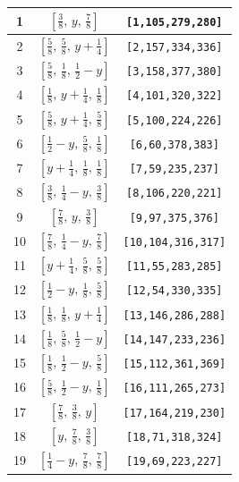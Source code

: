 \documentclass[fleqn,8pt]{jsarticle}
\begin{document}
\begin{longtable}{ccc}
1 & $\left[ \frac{3}{8},\, y,\, \frac{7}{8} \right]$ & {\tt [1,105,279,280]} \\ \hline
2 & $\left[ \frac{5}{8},\, \frac{5}{8},\, y + \frac{1}{4} \right]$ & {\tt [2,157,334,336]} \\ \hline
3 & $\left[ \frac{5}{8},\, \frac{1}{8},\, \frac{1}{2} - y \right]$ & {\tt [3,158,377,380]} \\ \hline
4 & $\left[ \frac{1}{8},\, y + \frac{1}{4},\, \frac{1}{8} \right]$ & {\tt [4,101,320,322]} \\ \hline
5 & $\left[ \frac{5}{8},\, y + \frac{1}{4},\, \frac{5}{8} \right]$ & {\tt [5,100,224,226]} \\ \hline
6 & $\left[ \frac{1}{2} - y,\, \frac{5}{8},\, \frac{1}{8} \right]$ & {\tt [6,60,378,383]} \\ \hline
7 & $\left[ y + \frac{1}{4},\, \frac{1}{8},\, \frac{1}{8} \right]$ & {\tt [7,59,235,237]} \\ \hline
8 & $\left[ \frac{3}{8},\, \frac{1}{4} - y,\, \frac{3}{8} \right]$ & {\tt [8,106,220,221]} \\ \hline
9 & $\left[ \frac{7}{8},\, y,\, \frac{3}{8} \right]$ & {\tt [9,97,375,376]} \\ \hline
10 & $\left[ \frac{7}{8},\, \frac{1}{4} - y,\, \frac{7}{8} \right]$ & {\tt [10,104,316,317]} \\ \hline
11 & $\left[ y + \frac{1}{4},\, \frac{5}{8},\, \frac{5}{8} \right]$ & {\tt [11,55,283,285]} \\ \hline
12 & $\left[ \frac{1}{2} - y,\, \frac{1}{8},\, \frac{5}{8} \right]$ & {\tt [12,54,330,335]} \\ \hline
13 & $\left[ \frac{1}{8},\, \frac{1}{8},\, y + \frac{1}{4} \right]$ & {\tt [13,146,286,288]} \\ \hline
14 & $\left[ \frac{1}{8},\, \frac{5}{8},\, \frac{1}{2} - y \right]$ & {\tt [14,147,233,236]} \\ \hline
15 & $\left[ \frac{1}{8},\, \frac{1}{2} - y,\, \frac{5}{8} \right]$ & {\tt [15,112,361,369]} \\ \hline
16 & $\left[ \frac{5}{8},\, \frac{1}{2} - y,\, \frac{1}{8} \right]$ & {\tt [16,111,265,273]} \\ \hline
17 & $\left[ \frac{7}{8},\, \frac{3}{8},\, y \right]$ & {\tt [17,164,219,230]} \\ \hline
18 & $\left[ y,\, \frac{7}{8},\, \frac{3}{8} \right]$ & {\tt [18,71,318,324]} \\ \hline
19 & $\left[ \frac{1}{4} - y,\, \frac{7}{8},\, \frac{7}{8} \right]$ & {\tt [19,69,223,227]} \\ \hline

\end{longtable}
\end{document}
